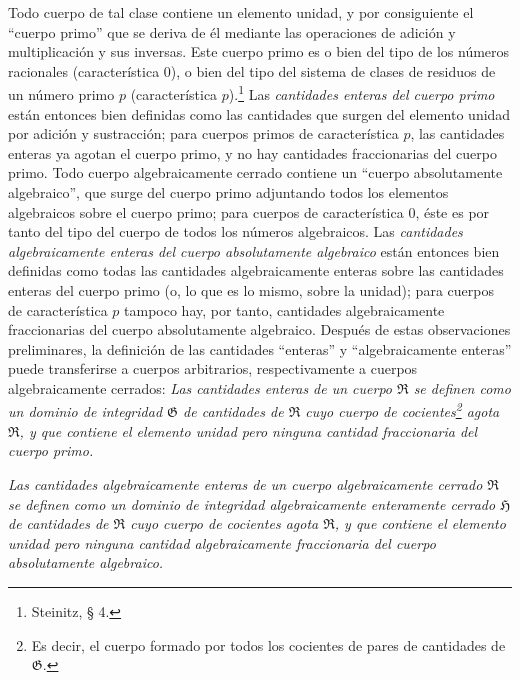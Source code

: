 \documentclass[11pt]{article}
\begin{document}
Todo cuerpo de tal clase contiene un elemento unidad, y por consiguiente el ``cuerpo primo'' que se deriva de él mediante las operaciones de adición y multiplicación y sus inversas. Este cuerpo primo es o bien del tipo de los números racionales (característica $0$), o bien del tipo del sistema de clases de residuos de un número primo $p$ (característica $p$).\footnote{Steinitz, § 4.} Las \emph{cantidades enteras del cuerpo primo} están entonces bien definidas como las cantidades que surgen del elemento unidad por adición y sustracción; para cuerpos primos de característica $p$, las cantidades enteras ya agotan el cuerpo primo, y no hay cantidades fraccionarias del cuerpo primo. Todo cuerpo algebraicamente cerrado contiene un ``cuerpo absolutamente algebraico'', que surge del cuerpo primo adjuntando todos los elementos algebraicos sobre el cuerpo primo; para cuerpos de característica $0$, éste es por tanto del tipo del cuerpo de todos los números algebraicos. Las \emph{cantidades algebraicamente enteras del cuerpo absolutamente algebraico} están entonces bien definidas como todas las cantidades algebraicamente enteras sobre las cantidades enteras del cuerpo primo (o, lo que es lo mismo, sobre la unidad); para cuerpos de característica $p$ tampoco hay, por tanto, cantidades algebraicamente fraccionarias del cuerpo absolutamente algebraico. Después de estas observaciones preliminares, la definición de las cantidades ``enteras'' y ``algebraicamente enteras'' puede transferirse a cuerpos arbitrarios, respectivamente a cuerpos algebraicamente cerrados: \emph{Las cantidades enteras de un cuerpo $\mathfrak R$ se definen como un dominio de integridad $\mathfrak G$ de cantidades de $\mathfrak R$ cuyo cuerpo de cocientes\footnote{Es decir, el cuerpo formado por todos los cocientes de pares de cantidades de $\mathfrak G$.} agota $\mathfrak R$, y que contiene el elemento unidad pero ninguna cantidad fraccionaria del cuerpo primo.}

\emph{Las cantidades algebraicamente enteras de un cuerpo algebraicamente cerrado $\mathfrak R$ se definen como un dominio de integridad algebraicamente enteramente cerrado $\mathfrak H$ de cantidades de $\mathfrak R$ cuyo cuerpo de cocientes agota $\mathfrak R$, y que contiene el elemento unidad pero ninguna cantidad algebraicamente fraccionaria del cuerpo absolutamente algebraico.}
\end{document}
